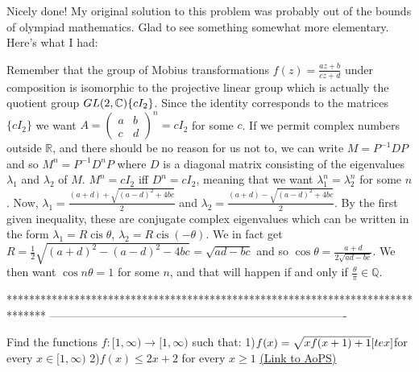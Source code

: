 \begin{solution}
	Nicely done! My original solution to this problem was probably out of the bounds of olympiad mathematics. Glad to see something somewhat more elementary. Here's what I had:

Remember that the group of Mobius transformations $f(z) = \frac{az + b}{cz + d}$ under composition is isomorphic to the projective linear group which is actually the quotient group $GL(2, \mathbb{C})\/\{ cI_2 \}$. Since the identity corresponds to the matrices $\{cI_2\}$ we want $A = \left(\begin{array}{cc}a & b \\ c & d\end{array}\right)^n = cI_2$ for some $c$. If we permit complex numbers outside $\mathbb{R}$, and there should be no reason for us not to, we can write $M = P^{-1}DP$ and so $M^n = P^{-1}D^nP$ where $D$ is a diagonal matrix consisting of the eigenvalues $\lambda_1$ and $\lambda_2$ of $M$. $M^n = cI_2$ iff $D^n = cI_2$, meaning that we want $\lambda_1^n = \lambda_2^n$ for some $n$. Now, $\lambda_1 = \frac{(a+d) + \sqrt{(a-d)^2 + 4bc}}{2}$ and $\lambda_2 = \frac{(a+d) - \sqrt{(a-d)^2 + 4bc}}{2}$. By the first given inequality, these are conjugate complex eigenvalues which can be written in the form $\lambda_1 = R\operatorname{cis}\theta$, $\lambda_2 = R\operatorname{cis}(-\theta)$. We in fact get $R = \frac{1}{2}\sqrt{(a+d)^2 - (a-d)^2 - 4bc} = \sqrt{ad - bc}$ and so $\cos{\theta} = \frac{a+d}{2\sqrt{ad-bc}}$. We then want $\cos{n\theta} = 1$ for some $n$, and that will happen if and only if $\frac{\theta}{\pi} \in \mathbb{Q}$.
\end{solution}
*******************************************************************************
-------------------------------------------------------------------------------

\begin{problem}
	Find the functions $f:[1,\infty) \rightarrow [1,\infty)$ such that:
1)$f(x)=\sqrt{xf(x+1)+1}[\/tex]$for every $x \in [1, \infty)$ 
2)$f(x) \le 2x+2$ for every $x \ge 1$
	\flushright \href{https://artofproblemsolving.com/community/c6h560714}{(Link to AoPS)}
\end{problem}



